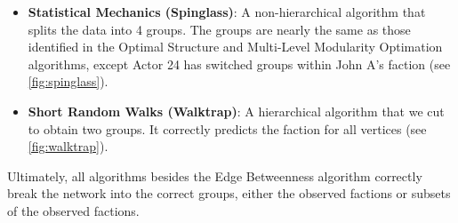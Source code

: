 \begin{itemize}
\item \textbf{Statistical Mechanics (Spinglass)}: A non-hierarchical algorithm that splits the data into 4 groups. The groups are nearly the same as those identified in the Optimal Structure and Multi-Level Modularity Optimation algorithms, except Actor 24 has switched groups within John A's faction (see \cref{fig:spinglass}).
\item \textbf{Short Random Walks (Walktrap)}: A hierarchical algorithm that we cut to obtain two groups. It correctly predicts the faction for all vertices (see \cref{fig:walktrap}).
\end{itemize}
Ultimately, all algorithms besides the Edge Betweenness algorithm correctly break the network into the correct groups, either the observed factions or subsets of the observed factions.

